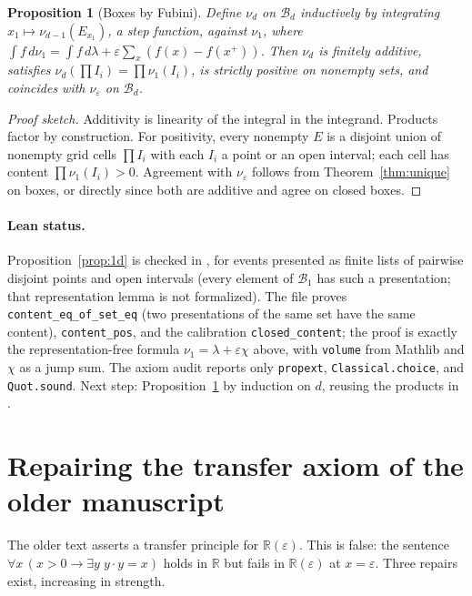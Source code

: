 \documentclass[11pt]{article}
\newtheorem{proposition}[theorem]{Proposition}
\theoremstyle{definition}
\theoremstyle{remark}
\newcommand{\R}{\mathbb R}
\newcommand{\eps}{\varepsilon}
\newcommand{\nuE}{\nu_{\eps}}
\begin{document}
\begin{proposition}[Boxes by Fubini]\label{prop:box}
Define $\nu_d$ on $\mathcal B_d$ inductively by integrating
$x_1\mapsto\nu_{d-1}(E_{x_1})$, a step function, against $\nu_1$, where
$\int f\,d\nu_1=\int f\,d\lambda+\eps\sum_x(f(x)-f(x^+))$. Then $\nu_d$ is
finitely additive, satisfies $\nu_d(\prod I_i)=\prod\nu_1(I_i)$, is
strictly positive on nonempty sets, and coincides with $\nuE$ on
$\mathcal B_d$.
\end{proposition}
\begin{proof}[Proof sketch]
Additivity is linearity of the integral in the integrand. Products
factor by construction. For positivity, every nonempty $E$ is a disjoint
union of nonempty grid cells $\prod I_i$ with each $I_i$ a point or an
open interval; each cell has content $\prod\nu_1(I_i)>0$. Agreement with
$\nuE$ follows from Theorem~\ref{thm:unique} on boxes, or directly since
both are additive and agree on closed boxes.
\end{proof}

\paragraph{Lean status.} Proposition~\ref{prop:1d} is checked in
, for events presented as finite lists of
pairwise disjoint points and open intervals (every element of
$\mathcal B_1$ has such a presentation; that representation lemma is not
formalized). The file proves \texttt{content\_eq\_of\_set\_eq} (two
presentations of the same set have the same content), \texttt{content\_pos},
and the calibration \texttt{closed\_content}; the proof is exactly the
representation-free formula $\nu_1=\lambda+\eps\chi$ above, with
\texttt{volume} from Mathlib and $\chi$ as a jump sum. The axiom audit
reports only \texttt{propext}, \texttt{Classical.choice}, and
\texttt{Quot.sound}. Next step: Proposition~\ref{prop:box} by induction on
$d$, reusing the products in .

\section{Repairing the transfer axiom of the older manuscript}
The older text asserts a transfer principle for $\R(\eps)$. This is
false: the sentence $\forall x\,(x>0\to\exists y\;y\cdot y=x)$ holds in
$\R$ but fails in $\R(\eps)$ at $x=\eps$. Three repairs exist,
increasing in strength.
\end{document}
